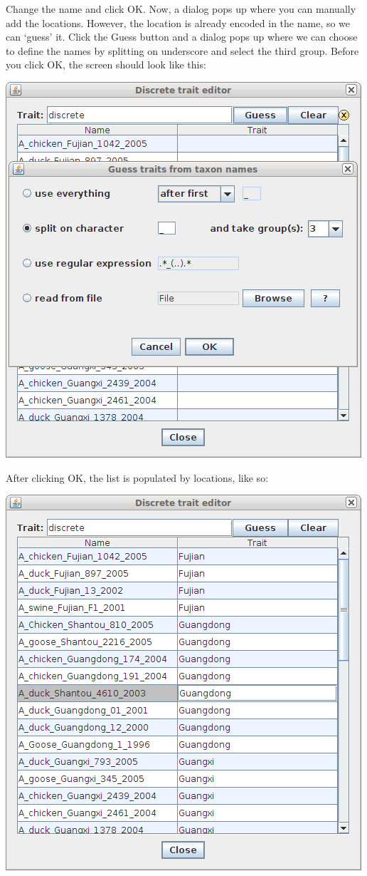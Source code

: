 \documentclass{article}
\begin{document}
Change the name and click OK. Now, a dialog pops up where you can manually add the locations. However, the location is already encoded in the name, so we can `guess' it. Click the Guess button and a dialog pops up where we can choose to define the names by splitting on underscore and select the third group. Before you click OK, the screen should look like this:

\includegraphics[scale=0.4]{figures/BEAUti_trait3.png}

After clicking OK, the list is populated by locations, like so:

\includegraphics[scale=0.4]{figures/BEAUti_trait4.png}
\end{document}
